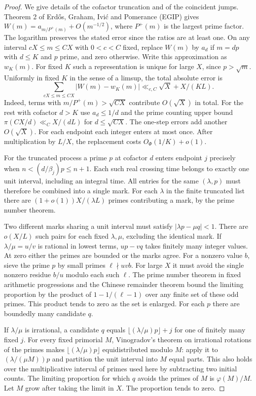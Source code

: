 \documentclass[10pt]{article}
\begin{document}
\begin{proof}
We give details of the cofactor truncation and of the coincident jumps. Theorem 2 of Erd\H os, Graham, Ivi\'c and Pomerance (EGIP) \cite{EGIP} gives $W(m)=a_{m/P^+(m)}+O(m^{-1/2})$, where $P^+(m)$ is the largest prime factor. The logarithm preserves the stated error since the ratios are at least one. On any interval $cX\le m\le CX$ with $0<c<C$ fixed, replace $W(m)$ by $a_d$ if $m=dp$ with $d\le K$ and $p$ prime, and zero otherwise. Write this approximation as $w_K(m)$. For fixed $K$ such a representation is unique for large $X$, since $p>\sqrt m$. Uniformly in fixed $K$ in the sense of a limsup, the total absolute error is
\begin{equation}\label{tail}
 \sum_{cX\le m\le CX}|W(m)-w_K(m)|\ll_{c,C} \sqrt X + X/(K L).
\end{equation}
Indeed, terms with $m/P^+(m)>\sqrt{CX}$ contribute $O(\sqrt X)$ in total. For the rest with cofactor $d>K$ use $a_d\le1/d$ and the prime counting upper bound $\pi(CX/d)\ll_C X/(dL)$ for $d\le\sqrt{CX}$. The one-step errors add another $O(\sqrt X)$. For each endpoint each integer enters at most once. After multiplication by $L/X$, the replacement costs $O_\Phi(1/K)+o(1)$.

For the truncated process a prime $p$ at cofactor $d$ enters endpoint $j$ precisely when $n<(d/\beta_j)p\le n+1$. Each such real crossing time belongs to exactly one unit interval, including an integral time. All entries for the same $(\lambda,p)$ must therefore be combined into a single mark. For each $\lambda$ in the finite truncated list there are $(1+o(1))X/(\lambda L)$ primes contributing a mark, by the prime number theorem.

Two different marks sharing a unit interval must satisfy $|\lambda p-\mu q|<1$. There are $o(X/L)$ such pairs for each fixed $\lambda,\mu$, excluding the identical mark. If $\lambda/\mu=u/v$ is rational in lowest terms, $up-vq$ takes finitely many integer values. At zero either the primes are bounded or the marks agree. For a nonzero value $b$, sieve the prime $p$ by small primes $\ell\nmid uvb$. For large $X$ it must avoid the single nonzero residue $b/u$ modulo each such $\ell$. The prime number theorem in fixed arithmetic progressions and the Chinese remainder theorem bound the limiting proportion by the product of $1-1/(\ell-1)$ over any finite set of these odd primes. This product tends to zero as the set is enlarged. For each $p$ there are boundedly many candidate $q$.

If $\lambda/\mu$ is irrational, a candidate $q$ equals $\lfloor(\lambda/\mu)p\rfloor+j$ for one of finitely many fixed $j$. For every fixed primorial $M$, Vinogradov's theorem on irrational rotations of the primes \cite{Vin} makes $\lfloor(\lambda/\mu)p\rfloor$ equidistributed modulo $M$: apply it to $(\lambda/(\mu M))p$ and partition the unit interval into $M$ equal parts. This also holds over the multiplicative interval of primes used here by subtracting two initial counts. The limiting proportion for which $q$ avoids the primes of $M$ is $\varphi(M)/M$. Let $M$ grow after taking the limit in $X$. The proportion tends to zero.


\end{proof}
\end{document}
